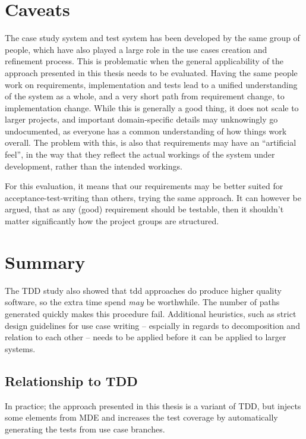 \section{Caveats}
The case study system and test system has been developed by the same group of people, which have also played a large role in the use cases creation and refinement process. This is problematic when the general applicability of the approach presented in this thesis needs to be evaluated. Having the same people work on requirements, implementation and tests lead to a unified understanding of the system as a whole, and a very short path from requirement change, to implementation change. While this is generally a good thing, it does not scale to larger projects, and important domain-specific details may unknowingly go undocumented, as everyone has a common understanding of how things work overall. The problem with this, is also that requirements may have an ``artificial feel'', in the way that they reflect the actual workings of the system under development, rather than the intended workings.\medskip

\noindent For this evaluation, it means that our requirements may be better suited for acceptance-test-writing than others, trying the same approach. It can however be argued, that as any (good) requirement should be testable\cite{hull2010requirements}, then it shouldn't matter significantly how the project groups are structured.

\section{Summary}
The TDD study also showed that tdd approaches do produce higher quality software, so the extra time spend \emph{may} be worthwhile.
The number of paths generated quickly makes this procedure fail. Additional heuristics, such as strict design guidelines for use case writing -- espcially in regards to decomposition and relation to each other -- needs to be applied before it can be applied to larger systems.

\subsection{Relationship to TDD}
In practice; the approach presented in this thesis is a variant of TDD, but injects some elements from MDE and increases the test coverage by automatically generating the tests from use case branches.

